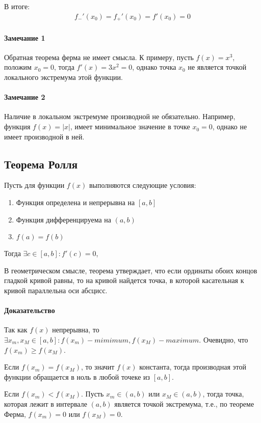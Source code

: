 \documentclass[10pt]{article}
\begin{document}
					В итоге:
					\begin{eqnarray}
						f_-'(x_0) = f_+'(x_0) = f'(x_0) = 0
					\end{eqnarray}
				\paragraph{Замечание 1} Обратная теорема ферма не имеет смысла. К примеру, пусть $f(x) = x^3$, положим $x_0 = 0$, тогда $f'(x) = 3x^2 = 0$, однако точка $x_0$ не является точкой локального экстремума этой функции.
				\paragraph{Замечание 2} Наличие в локальном экстремуме производной не обязательно. Например, функция $f(x) = |x|$, имеет минимальное значение в точке $x_0 = 0$, однако не имеет производной в ней.
				
			\subsection{Теорема Ролля}
				Пусть для функции $f(x)$ выполняются следующие условия:
				\begin{enumerate}
					\item Функция определена и непрерывна на $[a, b]$	
					\item Функция дифференцируема на $(a, b)$
					\item $f(a) = f(b)$
				\end{enumerate}
				Тогда $\exists c \in [a, b] : f'(c) = 0$,
				
				В геометрическом смысле, теорема утверждает, что если ординаты обоих концов гладкой кривой равны, то на кривой найдется точка, в которой касательная к кривой параллельна оси абсцисс.
				\paragraph{Доказательство}
					Так как $f(x)$ непрерывна, то $\exists x_m, x_M \in [a, b] : f(x_m) - mimimum, f(x_M) - maximum$. Очевидно, что $f(x_m) \geq f(x_M)$.
					
					Если $f(x_m) = f(x_M)$, то значит $f(x)$ константа, тогда производная этой функции обращается в ноль в любой точеке из $[a, b]$.
					
					Если $f(x_m) < f(x_M)$. Пусть $x_m \in (a, b)$ или $x_M \in (a, b)$, тогда точка, которая лежит в интервале $(a, b)$ является точкой экстремума, т.е., по теореме Ферма, $f(x_m) = 0$ или $f(x_M) = 0$.
					
\end{document}

